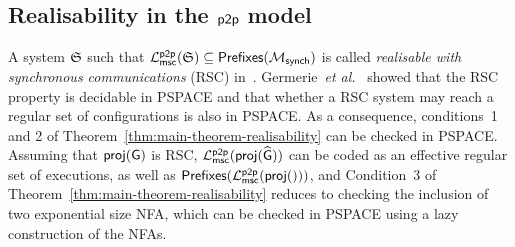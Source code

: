 \subsection{Realisability in the $\mathsf{p2p}$ model}


    
    
A system $\mathfrak S$ such that 
$\mathcal{L}_{\mathsf{msc}}^{\mathsf{p2p}}(\mathfrak S)\subseteq
\mathsf{Prefixes}(\mathcal{M}_{\mathsf{synch}})$
is called \emph{realisable with synchronous communications} (RSC) 
in~\cite{germerie-phd}. Germerie~\emph{et al.}~\cite{germerie-phd}
showed that the RSC property is decidable in PSPACE and that
whether a RSC system may reach a regular set of configurations is
also in PSPACE. As a consequence, conditions~1 and 2 of
Theorem~\ref{thm:main-theorem-realisability} can be checked in PSPACE.
Assuming that $\mathsf{proj}(\mathsf{G})$ is RSC, 
$\mathcal{L}_{\mathsf{msc}}^{\mathsf{p2p}}(\mathsf{proj}(\widehat{\mathsf{G}}))$ can be coded as an effective regular set of
executions, as well as $\mathsf{Prefixes}(\mathcal{L}_{\mathsf{msc}}^{\mathsf{p2p}}(\mathsf{proj}()))$,
and Condition~3 of Theorem~\ref{thm:main-theorem-realisability} reduces to checking the inclusion of
two exponential size NFA, which can be checked in PSPACE using a lazy construction of the NFAs.



% 

